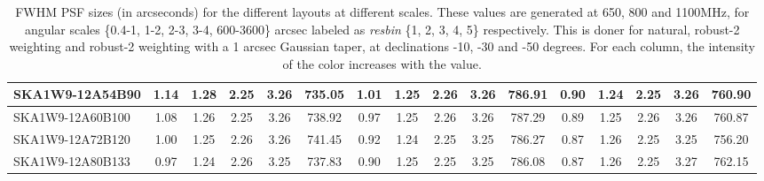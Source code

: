 \begin{table}[H]
{{\begin{tabular}{|lccccc||ccccc||ccccc|}
SKA1W9-12A54B90 & 1.14 \cellcolor{blue!60.00} & 1.28 \cellcolor{red!44.26} & 2.25 \cellcolor{green!18.00} & 3.26 \cellcolor{orange!51.37} & 735.05 \cellcolor{purple!18.00} & 1.01 \cellcolor{blue!60.00} & 1.25 \cellcolor{red!23.29} & 2.26 \cellcolor{green!40.29} & 3.26 \cellcolor{orange!55.70} & 786.91 \cellcolor{purple!30.51} & 0.90 \cellcolor{blue!43.92} & 1.24 \cellcolor{red!18.00} & 2.25 \cellcolor{green!37.16} & 3.26 \cellcolor{orange!30.99} & 760.90 \cellcolor{purple!51.16}\\ \hline 
SKA1W9-12A60B100 & 1.08 \cellcolor{blue!45.13} & 1.26 \cellcolor{red!27.99} & 2.25 \cellcolor{green!24.68} & 3.26 \cellcolor{orange!44.60} & 738.92 \cellcolor{purple!37.66} & 0.97 \cellcolor{blue!45.35} & 1.25 \cellcolor{red!20.11} & 2.26 \cellcolor{green!50.57} & 3.26 \cellcolor{orange!60.00} & 787.29 \cellcolor{purple!36.28} & 0.89 \cellcolor{blue!32.66} & 1.25 \cellcolor{red!28.80} & 2.26 \cellcolor{green!53.74} & 3.26 \cellcolor{orange!26.35} & 760.87 \cellcolor{purple!50.99}\\ \hline 
SKA1W9-12A72B120 & 1.00 \cellcolor{blue!27.05} & 1.25 \cellcolor{red!19.24} & 2.26 \cellcolor{green!59.52} & 3.26 \cellcolor{orange!49.50} & 741.45 \cellcolor{purple!50.58} & 0.92 \cellcolor{blue!26.50} & 1.24 \cellcolor{red!18.00} & 2.25 \cellcolor{green!26.57} & 3.25 \cellcolor{orange!28.02} & 786.27 \cellcolor{purple!20.84} & 0.87 \cellcolor{blue!20.99} & 1.26 \cellcolor{red!40.01} & 2.25 \cellcolor{green!18.00} & 3.25 \cellcolor{orange!18.00} & 756.20 \cellcolor{purple!18.00}\\ \hline 
SKA1W9-12A80B133 & 0.97 \cellcolor{blue!18.00} & 1.24 \cellcolor{red!18.00} & 2.26 \cellcolor{green!39.95} & 3.25 \cellcolor{orange!18.00} & 737.83 \cellcolor{purple!32.15} & 0.90 \cellcolor{blue!18.00} & 1.25 \cellcolor{red!26.75} & 2.25 \cellcolor{green!18.00} & 3.25 \cellcolor{orange!18.00} & 786.08 \cellcolor{purple!18.00} & 0.87 \cellcolor{blue!18.00} & 1.26 \cellcolor{red!42.98} & 2.25 \cellcolor{green!34.95} & 3.27 \cellcolor{orange!60.00} & 762.15 \cellcolor{purple!60.00}\\ \hline 
\end{tabular}}
\vspace{-0.300000cm}
\hspace{1cm} 

\vspace{.50cm}
\caption{FWHM PSF sizes (in arcseconds) for the different layouts at different scales. These values are generated at 650, 800 and 1100MHz, for angular scales \{0.4-1, 1-2, 2-3, 3-4, 600-3600\} arcsec labeled as {\it resbin} \{1, 2, 3, 4, 5\} respectively. This is doner for natural, robust-2 weighting and robust-2 weighting with a 1 arcsec Gaussian taper, at declinations -10, -30 and -50 degrees. For each column, the intensity of the color increases with the value.}\label{tab:psf_mean}}
 \end{table}
